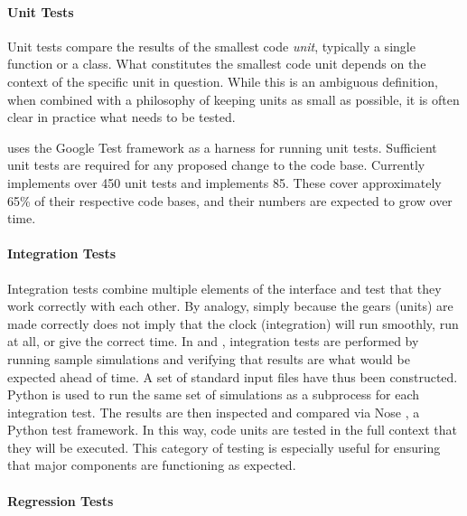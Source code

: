 \paragraph{Unit Tests}

Unit tests compare the results of the smallest code \emph{unit},
typically a single function or a class. What constitutes the smallest code
unit depends on the context of the specific unit in question. While this is
an ambiguous definition, when combined with a philosophy of keeping units as small
as possible, it is often clear in practice what needs to be tested.

\Cyclus uses the Google Test framework \cite{inc_googletest_2008} as a harness for running unit
tests. Sufficient unit tests are required for any proposed change to the \Cyclus
code base. Currently \Cyclus implements over 450 unit tests and \Cycamore implements
85.  These cover approximately 65\% of their respective code bases, and their numbers are expected to grow over time.

\paragraph{Integration Tests}

Integration tests combine multiple elements of the
\Cyclus interface and test that they work correctly with each other.  By analogy,
simply because the gears (units) are made correctly does not imply that the
clock (integration) will run smoothly, run at all, or give the correct time.
In \Cyclus and \Cycamore, integration tests are performed by running sample
simulations and verifying that results are what would be expected ahead of
time. A set of standard input files have thus been constructed.
Python is used to run the same set of \Cyclus simulations as a subprocess for each integration test.  The results are then inspected and compared via Nose \cite{pellerin_nose_2007}, a Python test framework.
In this way, \Cyclus code units are tested in the full context that they will be
executed. This category of testing is especially useful for ensuring that
major \Cyclus components are functioning as expected.

\paragraph{Regression Tests}

